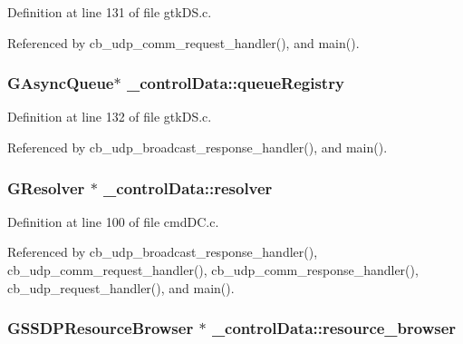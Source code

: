 Definition at line 131 of file gtk\+D\+S.\+c.



Referenced by cb\+\_\+udp\+\_\+comm\+\_\+request\+\_\+handler(), and main().

\hypertarget{struct__control_data_a09b9467cd00be5a9ecac2386429ab65a}{
\subsubsection[{queue\+Registry}]{\setlength{\rightskip}{0pt plus 5cm}G\+Async\+Queue$\ast$ \+\_\+control\+Data\+::queue\+Registry}}\label{struct__control_data_a09b9467cd00be5a9ecac2386429ab65a}


Definition at line 132 of file gtk\+D\+S.\+c.



Referenced by cb\+\_\+udp\+\_\+broadcast\+\_\+response\+\_\+handler(), and main().

\hypertarget{struct__control_data_afe33a7083e1ecc9ba50a69644ed4a753}{
\subsubsection[{resolver}]{\setlength{\rightskip}{0pt plus 5cm}G\+Resolver $\ast$ \+\_\+control\+Data\+::resolver}}\label{struct__control_data_afe33a7083e1ecc9ba50a69644ed4a753}


Definition at line 100 of file cmd\+D\+C.\+c.



Referenced by cb\+\_\+udp\+\_\+broadcast\+\_\+response\+\_\+handler(), cb\+\_\+udp\+\_\+comm\+\_\+request\+\_\+handler(), cb\+\_\+udp\+\_\+comm\+\_\+response\+\_\+handler(), cb\+\_\+udp\+\_\+request\+\_\+handler(), and main().

\hypertarget{struct__control_data_a796910b4ad0830538301efd69811c2c6}{
\subsubsection[{resource\+\_\+browser}]{\setlength{\rightskip}{0pt plus 5cm}G\+S\+S\+D\+P\+Resource\+Browser $\ast$ \+\_\+control\+Data\+::resource\+\_\+browser}}\label{struct__control_data_a796910b4ad0830538301efd69811c2c6}



